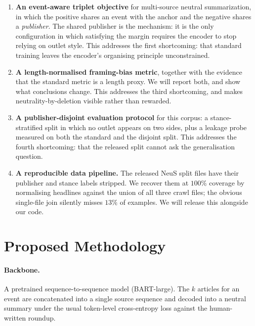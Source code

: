 \documentclass[11pt]{article}
\begin{document}
\begin{enumerate}\itemsep2pt
\item \textbf{An event-aware triplet objective} for multi-source neutral
summarization, in which the positive shares an event with the anchor and the
negative shares a \emph{publisher}. The shared publisher is the mechanism: it is
the only configuration in which satisfying the margin requires the encoder to
stop relying on outlet style. This addresses the first shortcoming: that
standard training leaves the encoder's organising principle unconstrained.

\item \textbf{A length-normalised framing-bias metric}, together with the
evidence that the standard metric is a length proxy. We will report both, and
show what conclusions change. This addresses the third shortcoming, and makes
neutrality-by-deletion visible rather than rewarded.

\item \textbf{A publisher-disjoint evaluation protocol} for this corpus: a
stance-stratified split in which no outlet appears on two sides, plus a leakage
probe measured on both the standard and the disjoint split. This addresses the
fourth shortcoming: that the released split cannot ask the generalisation
question.

\item \textbf{A reproducible data pipeline.} The released NeuS split files have
their publisher and stance labels stripped. We recover them at $100\%$ coverage
by normalising headlines against the union of all three crawl files; the
obvious single-file join silently misses $13\%$ of examples. We will release
this alongside our code.
\end{enumerate}

\section{Proposed Methodology}

\paragraph{Backbone.} A pretrained sequence-to-sequence model (BART-large). The
$k$ articles for an event are concatenated into a single source sequence and
decoded into a neutral summary under the usual token-level cross-entropy loss
against the human-written roundup.
\end{document}
